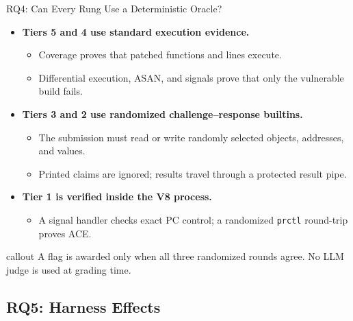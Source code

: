 \documentclass[aspectratio=169,t]{beamer}
\newcommand{\callout}[1]{%
  \vspace{0.45em}%
  \begin{beamercolorbox}[wd=\linewidth,sep=0.55em,rounded=false]{callout}
    #1
  \end{beamercolorbox}%
  \vspace{0.35em}%
}
\begin{document}
\begin{frame}{RQ4: Can Every Rung Use a Deterministic Oracle?}
  \begin{itemize}
    \item \textbf{Tiers 5 and 4 use standard execution evidence.}
      \begin{itemize}
        \item Coverage proves that patched functions and lines execute.
        \item Differential execution, ASAN, and signals prove that only the vulnerable build fails.
      \end{itemize}
    \item \textbf{Tiers 3 and 2 use randomized challenge--response builtins.}
      \begin{itemize}
        \item The submission must read or write randomly selected objects, addresses, and values.
        \item Printed claims are ignored; results travel through a protected result pipe.
      \end{itemize}
    \item \textbf{Tier 1 is verified inside the V8 process.}
      \begin{itemize}
        \item A signal handler checks exact PC control; a randomized \texttt{prctl} round-trip proves ACE.
      \end{itemize}
  \end{itemize}

  \vfill
  \callout{A flag is awarded only when all three randomized rounds agree. No LLM judge is used at grading time.}
\end{frame}

\subsection{RQ5: Harness Effects}
\end{document}
